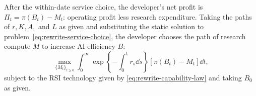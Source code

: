 After the within-date service choice, the developer's net profit is
$\Pi_t=\pi(B_t)-M_t$: operating profit less research expenditure.
Taking the paths of $r,K,A,$ and $L$ as given and substituting the static
solution to problem~\eqref{eq:rewrite-service-choice}, the developer chooses
the path of research compute $M$ to increase AI efficiency $B$:
\begin{equation}
\max_{\{M_t\}_{t\geq0}}
 \int_0^\infty
 \exp\left\{-\int_0^t r_s\dd s\right\}
 [\pi(B_t)-M_t]\dd t,
 \label{eq:rewrite-developer-reduced}
\end{equation}
subject to the RSI technology given by \eqref{eq:rewrite-capability-law} and taking $B_0$ as given. %


